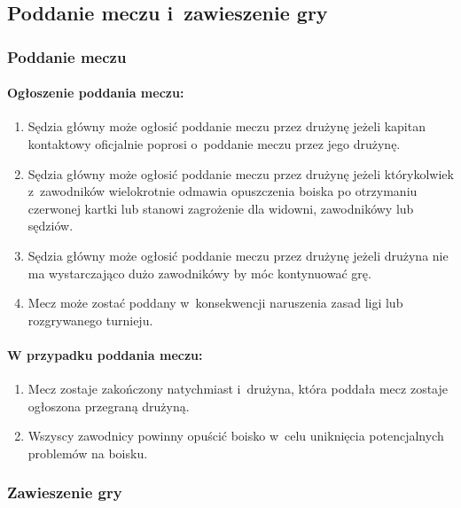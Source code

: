 \documentclass[12pt]{article}
\begin{document}
\subsection{Poddanie meczu i~zawieszenie gry}

\subsubsection{Poddanie meczu}

\paragraph{Ogłoszenie poddania meczu:}

\begin{enumerate}
	\item
	      Sędzia główny może ogłosić poddanie meczu przez drużynę jeżeli kapitan
	      kontaktowy oficjalnie poprosi o~poddanie meczu przez jego drużynę.
	\item
	      Sędzia główny może ogłosić poddanie meczu przez drużynę jeżeli
	      którykolwiek z~zawodników wielokrotnie odmawia opuszczenia boiska po
	      otrzymaniu czerwonej kartki lub stanowi zagrożenie dla widowni,
	      zawodnikówy lub sędziów.
	\item
	      Sędzia główny może ogłosić poddanie meczu przez drużynę jeżeli drużyna
	      nie ma wystarczająco dużo zawodnikówy by móc kontynuować grę.
	\item
	      Mecz może zostać poddany w~konsekwencji naruszenia zasad ligi lub
	      rozgrywanego turnieju.
\end{enumerate}

\paragraph{W przypadku poddania meczu:}

\begin{enumerate}
	\item
	      Mecz zostaje zakończony natychmiast i~drużyna, która poddała mecz
	      zostaje ogłoszona przegraną drużyną.
	\item
	      Wszyscy zawodnicy powinny opuścić boisko w~celu uniknięcia
	      potencjalnych problemów na boisku.
\end{enumerate}

\subsubsection{Zawieszenie gry}
\end{document}
